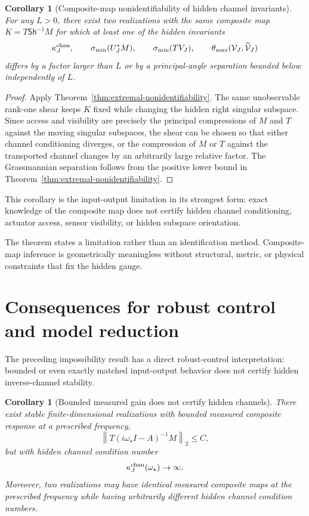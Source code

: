 \documentclass[review]{siamart220329}
\newtheorem{corollary}[theorem]{Corollary}
\theoremstyle{definition}
\theoremstyle{remark}
\newcommand{\calV}{\mathcal{V}}
\newcommand{\Sh}{\mathsf{Sh}}
\newcommand{\smin}{\sigma_{\min}}
\newcommand{\norm}[1]{\left\lVert #1\right\rVert}
\begin{document}
\begin{corollary}[Composite-map nonidentifiability of hidden channel invariants]
\label{cor:composite-hidden-invariants}
For any $L>0$, there exist two realizations with the same composite map
$K=T\Sh^{-1}M$ for which at least one of the hidden invariants
\[
    \kappa_J^{\rm chan},\qquad
    \smin(U_J^*M),\qquad
    \smin(TV_J),\qquad
    \theta_{\max}(\calV_J,\widetilde{\calV}_J)
\]
differs by a factor larger than $L$ or by a principal-angle separation bounded
below independently of $L$.
\end{corollary}

\begin{proof}
Apply Theorem~\ref{thm:extremal-nonidentifiability}. The same unobservable
rank-one shear keeps $K$ fixed while changing the hidden right singular
subspace. Since access and visibility are precisely the principal compressions
of $M$ and $T$ against the moving singular subspaces, the shear can be chosen so
that either channel conditioning diverges, or the compression of $M$ or $T$
against the transported channel changes by an arbitrarily large relative factor.
The Grassmannian separation follows from the positive lower bound in
Theorem~\ref{thm:extremal-nonidentifiability}.
\end{proof}

This corollary is the input-output limitation in its strongest form: exact
knowledge of the composite map does not certify hidden channel conditioning,
actuator access, sensor visibility, or hidden subspace orientation.



The theorem states a limitation rather than an identification method. Composite-map inference is geometrically meaningless without structural, metric, or physical constraints that fix the hidden gauge.



\section{Consequences for robust control and model reduction}\label{sec:control-corollary}

The preceding impossibility result has a direct robust-control interpretation:
bounded or even exactly matched input-output behavior does not certify hidden
inverse-channel stability.

\begin{corollary}[Bounded measured gain does not certify hidden channels]
\label{cor:hinfty-hidden-channel}
There exist stable finite-dimensional realizations with bounded measured
composite response at a prescribed frequency,
\begin{equation}
    \norm{T(i\omega_\star I-A)^{-1}M}_2 \le C,
\end{equation}
but with hidden channel condition number
\begin{equation}
    \kappa_J^{\rm chan}(\omega_\star)\to\infty .
\end{equation}
Moreover, two realizations may have identical measured composite maps at the
prescribed frequency while having arbitrarily different hidden channel condition
numbers.
\end{corollary}
\end{document}
